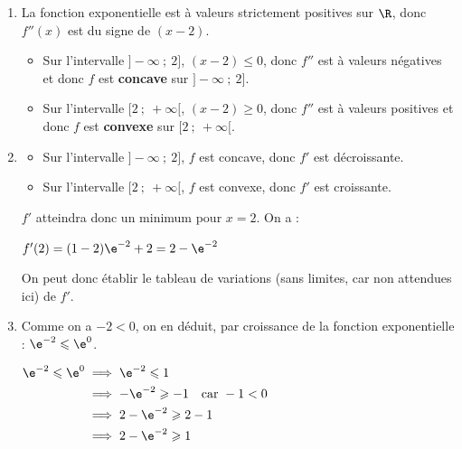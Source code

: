 \begin{enumerate}
$f''(x)=-1 \times \e^{-x} + (1-x) \times \big(- \e^{-x}\big) + 0 = \big(-1 - (1-x)\big)\e^{-x} = (x - 2)\e^{-x}$.

On arrive bien à l'expression annoncée.

\item La fonction exponentielle est à valeurs strictement positives sur $\R$, donc $f''(x)$ est du signe de $(x - 2)$.

\begin{itemize}
\item Sur l'intervalle $]-\infty ~;~ 2]$, $(x - 2) \leqslant 0$, donc $f''$ est à valeurs négatives et donc $f$ est \textbf{concave} sur $]-\infty ~;~ 2]$.
\item Sur l'intervalle $[2 ~;~ +\infty[$, $(x - 2) \geqslant 0$, donc $f''$ est à valeurs positives et donc $f$ est \textbf{convexe} sur $[2 ~;~ +\infty[$.
\end{itemize}

\item 
\begin{itemize}
\item Sur l'intervalle $]-\infty ~;~ 2]$, $f$ est concave, donc $f'$ est décroissante.
\item Sur l'intervalle $[2 ~;~ +\infty[$, $f$ est convexe, donc $f'$ est croissante.
\end{itemize}

$f'$ atteindra donc un minimum pour $x = 2$. On a :

$f'(2) = (1 - 2)\e^{-2} + 2 = 2 - \e^{-2}$

On peut donc établir le tableau de variations (sans limites, car non attendues ici) de $f'$.




		\item Comme on a $-2< 0$, on en déduit, par croissance de la fonction exponentielle : \quad $\e^{-2} \leqslant \e^{0}$.

$\begin{aligned}
\e^{-2} \leqslant \e^{0}
&\implies \e^{-2} \leqslant 1\\
&\implies -\e^{-2} \geqslant -1\quad \text{car }-1 < 0\\
&\implies 2-\e^{-2} \geqslant 2-1\\
&\implies 2-\e^{-2} \geqslant 1\\
\end{aligned}$


\end{enumerate}
